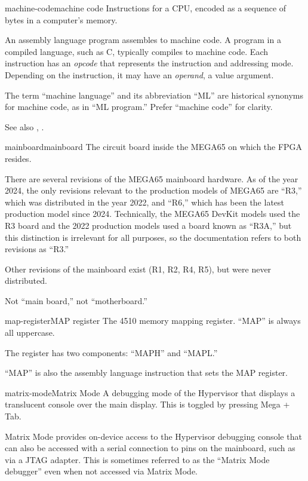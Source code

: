 \begin{sgentry}{machine-code}{machine code}
    Instructions for a CPU, encoded as a sequence of bytes in a computer's memory.

    An assembly language program assembles to machine code. A program in a compiled language, such as C, typically compiles to machine code. Each instruction has an \emph{opcode} that represents the instruction and addressing mode. Depending on the instruction, it may have an \emph{operand}, a value argument.

    The term ``machine language'' and its abbreviation ``ML'' are historical synonyms for machine code, as in ``ML program.'' Prefer ``machine code'' for clarity.

    See also , .
\end{sgentry}

\begin{sgentry}{mainboard}{mainboard}
    The circuit board inside the MEGA65 on which the FPGA resides.

    There are several revisions of the MEGA65 mainboard hardware. As of the year 2024, the only revisions relevant to the production models of MEGA65 are ``R3,'' which was distributed in the year 2022, and ``R6,'' which has been the latest production model since 2024. Technically, the MEGA65 DevKit models used the R3 board and the 2022 production models used a board known as ``R3A,'' but this distinction is irrelevant for all purposes, so the documentation refers to both revisions as ``R3.''

    Other revisions of the mainboard exist (R1, R2, R4, R5), but were never distributed.

    Not ``main board,'' not ``motherboard.''
\end{sgentry}

\begin{sgentry}{map-register}{MAP register}
    The 4510 memory mapping register. ``MAP'' is always all uppercase.

    The register has two components: ``MAPH'' and ``MAPL.''

    ``MAP'' is also the assembly language instruction that sets the MAP register.
\end{sgentry}

\begin{sgentry}{matrix-mode}{Matrix Mode}
    A debugging mode of the Hypervisor that displays a translucent console over the main display. This is toggled by pressing Mega + Tab.

    Matrix Mode provides on-device access to the Hypervisor debugging console that can also be accessed with a serial connection to pins on the mainboard, such as via a JTAG adapter. This is sometimes referred to as the ``Matrix Mode debugger'' even when not accessed via Matrix Mode.
\end{sgentry}

